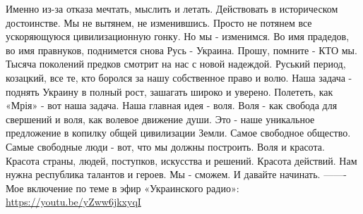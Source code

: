 Именно из-за отказа мечтать, мыслить и летать. Действовать в историческом достоинстве. 
Мы не вытянем, не изменившись. Просто не потянем все ускоряющуюся цивилизационную гонку. 
Но мы - изменимся. Во имя прадедов, во имя правнуков, поднимется снова Русь - Украина. 
Прошу, помните - КТО мы. 
Тысяча поколений предков смотрит на нас с новой надеждой. Руський период, козацкий, все те, кто боролся за нашу собственное право и волю. 
Наша задача - поднять Украину в полный рост, зашагать широко и уверено. 
Полететь, как «Мрія» - вот наша задача. 
Наша главная идея - воля. Воля - как свобода для свершений и воля, как волевое движение души. 
Это - наше уникальное предложение в копилку общей цивилизации Земли.
Самое свободное общество. Самые свободные люди - вот, что мы должны построить. 
Воля и красота. Красота страны, людей, поступков, искусства и решений. Красота действий. 
Нам нужна республика талантов и героев. 
Мы - сможем.
И давайте начинать. 
\restorecr
——-
Мое включение по теме в эфир «Украинского радио»:
\url{https://youtu.be/yZww6jkxyqI}
